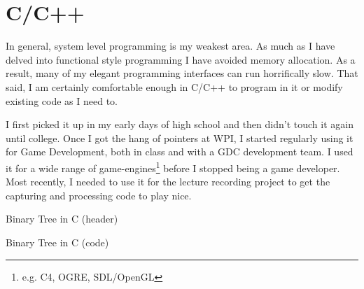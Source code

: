 \section{C/C++}

In general, system level programming is my weakest area. As much as I
have delved into functional style programming I have avoided memory
allocation. As a result, many of my elegant programming interfaces can
run horrifically slow. That said, I am certainly comfortable enough in
C/C++ to program in it or modify existing code as I need to.

I first picked it up in my early days of high school and then didn't touch it
again until college.  Once I got the hang of pointers at WPI, I started
regularly using it for Game Development, both in class and with a GDC
development team.  I used it for a wide range of game-engines\footnote{e.g. C4,
OGRE, SDL/OpenGL} before I stopped being a game developer.  Most recently, I
needed to use it for the lecture recording project to get the capturing and
processing code to play nice.

{Binary Tree in C (header)}

{Binary Tree in C (code)}
